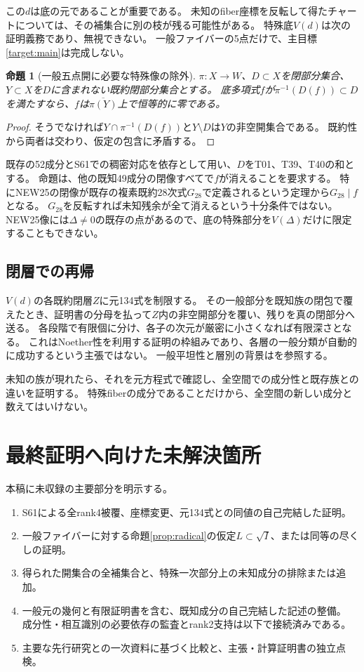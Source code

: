 \documentclass[a4paper,11pt]{ltjsarticle}
\newtheorem{proposition}{命題}[section]
\theoremstyle{definition}
\begin{document}
この\(d\)は底の元であることが重要である。
未知のfiber座標を反転して得たチャートについては、その補集合に別の枝が残る可能性がある。
特殊底\(V(d)\)は次の証明義務であり、無視できない。
一般ファイバーの5点だけで、主目標\ref{target:main}は完成しない。

\begin{proposition}[一般五点開に必要な特殊像の除外]\label{prop:forced-denominator}
\(\pi:X\to W\)、\(D\subset X\)を閉部分集合、\(Y\subset X\)を\(D\)に含まれない既約閉部分集合とする。
底多項式\(f\)が\(\pi^{-1}(D(f))\subset D\)を満たすなら、\(f\)は\(\overline{\pi(Y)}\)上で恒等的に零である。
\end{proposition}
\begin{proof}
そうでなければ\(Y\cap\pi^{-1}(D(f))\)と\(Y\setminus D\)は\(Y\)の非空開集合である。
既約性から両者は交わり、仮定の包含に矛盾する。
\end{proof}

既存の52成分とS61での稠密対応を依存として用い、\(D\)をT01、T39、T40の和とする。
命題は、他の既知49成分の閉像すべてで\(f\)が消えることを要求する。
特にNEW25の閉像が既存の複素既約28次式\(G_{28}\)で定義されるという定理から\(G_{28}\mid f\)となる。
\(G_{28}\)を反転すれば未知残余が全て消えるという十分条件ではない。
NEW25像には\(\Delta\ne0\)の既存の点があるので、底の特殊部分を\(V(\Delta)\)だけに限定することもできない。

\subsection{閉層での再帰}
\(V(d)\)の各既約閉層\(Z\)に元134式を制限する。
その一般部分を既知族の閉包で覆えたとき、証明書の分母を払って\(Z\)内の非空開部分を覆い、残りを真の閉部分へ送る。
各段階で有限個に分け、各子の次元が厳密に小さくなれば有限深さとなる。
これはNoether性を利用する証明の枠組みであり、各層の一般分類が自動的に成功するという主張ではない。
一般平坦性と層別の背景は\cite{stacks0529,stacks0H3Y}を参照する。

未知の族が現れたら、それを元方程式で確認し、全空間での成分性と既存族との違いを証明する。
特殊fiberの成分であることだけから、全空間の新しい成分と数えてはいけない。

\section{最終証明へ向けた未解決箇所}
本稿に未収録の主要部分を明示する。
\begin{enumerate}
\item S61による全rank4被覆、座標変更、元134式との同値の自己完結した証明。
\item 一般ファイバーに対する命題\ref{prop:radical}の仮定\(L\subset\sqrt I\)、または同等の尽くしの証明。
\item 得られた開集合の全補集合と、特殊一次部分上の未知成分の排除または追加。
\item 一般元の幾何と有限証明書を含む、既知成分の自己完結した記述の整備。
成分性・相互識別の必要依存の監査とrank2支持は以下で接続済みである。
\item 主要な先行研究との一次資料に基づく比較と、主張・計算証明書の独立点検。
\end{enumerate}
\end{document}
